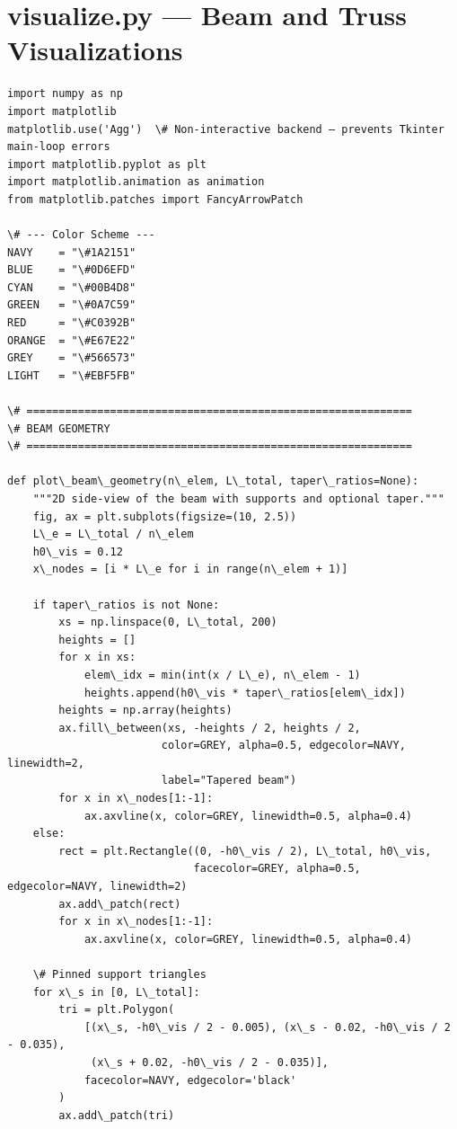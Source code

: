 \documentclass[12pt, a4paper]{article}
\begin{document}
\section{visualize.py --- Beam and Truss Visualizations}
\begin{lstlisting}[style=codestyle, caption={{visualize.py --- Beam and Truss Visualizations}}]
import numpy as np
import matplotlib
matplotlib.use('Agg')  \# Non-interactive backend — prevents Tkinter main-loop errors
import matplotlib.pyplot as plt
import matplotlib.animation as animation
from matplotlib.patches import FancyArrowPatch

\# --- Color Scheme ---
NAVY    = "\#1A2151"
BLUE    = "\#0D6EFD"
CYAN    = "\#00B4D8"
GREEN   = "\#0A7C59"
RED     = "\#C0392B"
ORANGE  = "\#E67E22"
GREY    = "\#566573"
LIGHT   = "\#EBF5FB"

\# ============================================================
\# BEAM GEOMETRY
\# ============================================================

def plot\_beam\_geometry(n\_elem, L\_total, taper\_ratios=None):
    """2D side-view of the beam with supports and optional taper."""
    fig, ax = plt.subplots(figsize=(10, 2.5))
    L\_e = L\_total / n\_elem
    h0\_vis = 0.12
    x\_nodes = [i * L\_e for i in range(n\_elem + 1)]

    if taper\_ratios is not None:
        xs = np.linspace(0, L\_total, 200)
        heights = []
        for x in xs:
            elem\_idx = min(int(x / L\_e), n\_elem - 1)
            heights.append(h0\_vis * taper\_ratios[elem\_idx])
        heights = np.array(heights)
        ax.fill\_between(xs, -heights / 2, heights / 2,
                        color=GREY, alpha=0.5, edgecolor=NAVY, linewidth=2,
                        label="Tapered beam")
        for x in x\_nodes[1:-1]:
            ax.axvline(x, color=GREY, linewidth=0.5, alpha=0.4)
    else:
        rect = plt.Rectangle((0, -h0\_vis / 2), L\_total, h0\_vis,
                             facecolor=GREY, alpha=0.5, edgecolor=NAVY, linewidth=2)
        ax.add\_patch(rect)
        for x in x\_nodes[1:-1]:
            ax.axvline(x, color=GREY, linewidth=0.5, alpha=0.4)

    \# Pinned support triangles
    for x\_s in [0, L\_total]:
        tri = plt.Polygon(
            [(x\_s, -h0\_vis / 2 - 0.005), (x\_s - 0.02, -h0\_vis / 2 - 0.035),
             (x\_s + 0.02, -h0\_vis / 2 - 0.035)],
            facecolor=NAVY, edgecolor='black'
        )
        ax.add\_patch(tri)


\end{lstlisting}
\end{document}
